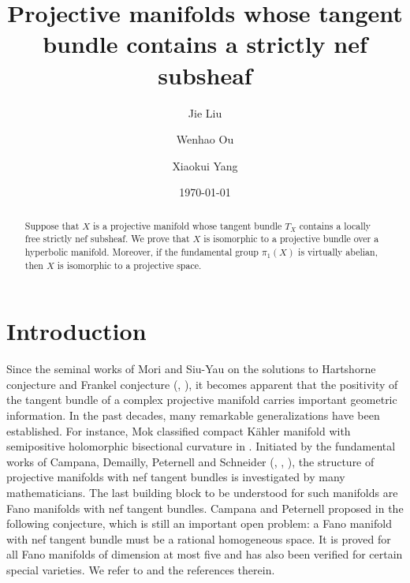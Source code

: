 \documentclass[english,reqno]{amsart}
\title{Projective manifolds whose tangent bundle contains a strictly nef subsheaf}
\date{\today}
\author{Jie Liu}
\author{Wenhao Ou}
\author{Xiaokui Yang}
\theoremstyle{plain}
\theoremstyle{definition}
\numberwithin{equation}{section} %
\begin{document}
\begin{abstract}Suppose that $X$ is a projective manifold whose tangent bundle $T_X$ contains a locally free strictly nef  subsheaf.  We prove that $X$ is isomorphic to a projective bundle over a hyperbolic  manifold.  Moreover, if  the fundamental group $\pi_1(X)$ is  virtually abelian, then $X$ is isomorphic to a projective space.
\end{abstract}


\maketitle

\tableofcontents

\vspace{-0.2cm}

\section{Introduction}





Since the seminal works of Mori   and Siu-Yau on the solutions to
Hartshorne
 conjecture   and Frankel conjecture
(\cite{Mori1979}, \cite{SiuYau1980}), it becomes apparent that the
positivity
  of the tangent bundle of a complex projective manifold
  carries important geometric information. In the past
decades,  many remarkable generalizations  have been
established. For instance, Mok classified compact K\"ahler manifold
with semipositive holomorphic bisectional curvature in
\cite{Mok1988}. Initiated by the fundamental works of Campana,
Demailly, Peternell and Schneider (\cite{CampanaPeternell1991},
\cite{DemaillyPeternellSchneider1994}, \cite{Peternell1996}), the
structure of projective manifolds with nef tangent bundles is
investigated by many mathematicians.
The  last building block to be understood for such manifolds are Fano manifolds with nef tangent bundles.
 Campana and Peternell proposed in \cite{CampanaPeternell1991} the following
conjecture, which is still an important  open problem: a  Fano manifold with nef tangent bundle  must be a rational
homogeneous space.
It is proved for all Fano manifolds of
dimension at most five and has also been verified for certain
special varieties.  We refer to
\cite{CampanaPeternell1991,CampanaPeternell1993,Mok2002,Hwang2006,Pandharipande2013,
Watanabe2014,MunozOcchettaSolaCondeWatanabeEtAl2015,Kanemitsu2017,Li2017}
and the references therein.
\end{document}
